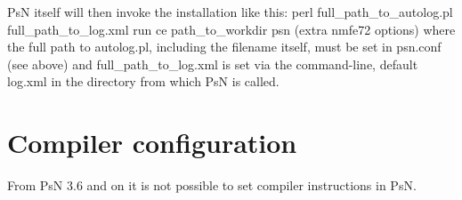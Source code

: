 \documentclass[a4paper,12pt]{article}
\begin{document}
PsN itself will then invoke the installation like this:
perl full\_path\_to\_autolog.pl full\_path\_to\_log.xml run ce path\_to\_workdir psn (extra nmfe72 options)
where the full path to autolog.pl, including the filename itself, must be set in psn.conf (see above) and full\_path\_to\_log.xml is set via the command-line, default log.xml in the directory from which PsN is called.

\section{Compiler configuration}

From PsN 3.6 and on it is not possible to set compiler instructions in PsN.
\end{document}
